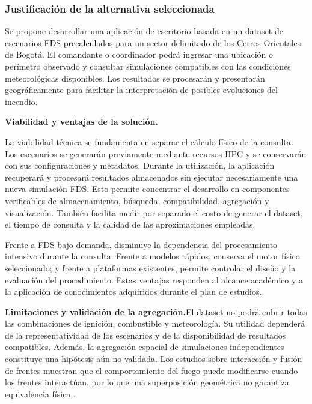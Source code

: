 \subsubsection{Justificación de la alternativa seleccionada}
\label{sec:justificacion-alternativa}

Se propone desarrollar una aplicación de escritorio basada en \textcolor{black}{un dataset de escenarios FDS precalculados} para un sector delimitado de los Cerros Orientales de Bogotá. El comandante o coordinador podrá ingresar una ubicación o perímetro observado y consultar simulaciones compatibles con las condiciones meteorológicas disponibles. Los resultados se procesarán y presentarán geográficamente para facilitar la interpretación de posibles evoluciones del incendio.

\textbf{Viabilidad y ventajas de la solución.}

La viabilidad técnica se fundamenta en separar el cálculo físico de la consulta. Los escenarios se generarán previamente mediante recursos HPC y se conservarán con sus configuraciones y metadatos. Durante la utilización, la aplicación recuperará y procesará resultados almacenados sin ejecutar necesariamente una nueva simulación FDS. Esto permite concentrar el desarrollo en componentes verificables de almacenamiento, búsqueda, compatibilidad, agregación y visualización. También facilita medir por separado el costo de generar \textcolor{black}{el dataset}, el tiempo de consulta y la calidad de las aproximaciones empleadas.

Frente a FDS bajo demanda, disminuye la dependencia del procesamiento intensivo durante la consulta. Frente a modelos rápidos, conserva el motor físico seleccionado; y frente a plataformas existentes, permite controlar el diseño y la evaluación del procedimiento. Estas ventajas responden al alcance académico y a la aplicación de conocimientos adquiridos durante el plan de estudios.

\textbf{Limitaciones y validación de la agregación.}\textcolor{black}{El dataset no podrá} cubrir todas las combinaciones de ignición, combustible y meteorología. Su utilidad dependerá de la representatividad de los escenarios y de la disponibilidad de resultados compatibles. Además, la agregación espacial de simulaciones independientes constituye una hipótesis aún no validada. Los estudios sobre interacción y fusión de frentes muestran que el comportamiento del fuego puede modificarse cuando los frentes interactúan, por lo que una superposición geométrica no garantiza equivalencia física \cite{vfpRibeiro2022,vfpWadhwani2023}.

